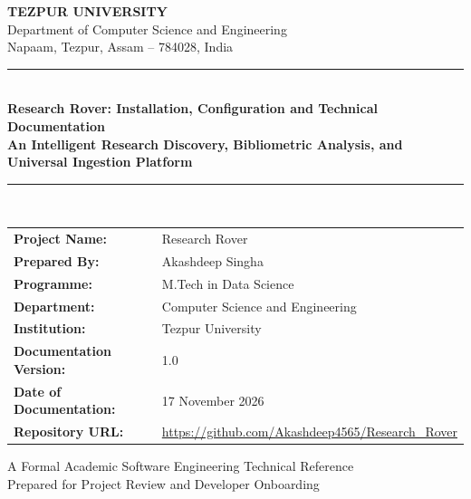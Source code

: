 \documentclass[12pt,a4paper]{article}
\begin{document}
\begin{titlepage}
    \begin{center}
        \vspace*{0.5in}
        
        {\Large \textbf{TEZPUR UNIVERSITY}}\\[0.2cm]
        {\large Department of Computer Science and Engineering}\\[0.1cm]
        {\normalsize Napaam, Tezpur, Assam -- 784028, India}\\[1.5cm]
        
        \rule{\linewidth}{1.2pt}\\[0.4cm]
        {\huge \textbf{Research Rover: Installation, Configuration and Technical Documentation}}\\[0.3cm]
        {\large \textbf{An Intelligent Research Discovery, Bibliometric Analysis, and Universal Ingestion Platform}}\\[0.2cm]
        \rule{\linewidth}{1.2pt}\\[2.0cm]
        
        \begin{minipage}{0.85\textwidth}
            \begin{tabular}{ll}
                \textbf{Project Name:} & Research Rover \\
                \textbf{Prepared By:} & Akashdeep Singha \\
                \textbf{Programme:} & M.Tech in Data Science \\
                \textbf{Department:} & Computer Science and Engineering \\
                \textbf{Institution:} & Tezpur University \\
                \textbf{Documentation Version:} & 1.0 \\
                \textbf{Date of Documentation:} & 17 November 2026 \\
                \textbf{Repository URL:} & \url{https://github.com/Akashdeep4565/Research_Rover} \\
            \end{tabular}
        \end{minipage}
        
        \vfill
        
        {\normalsize A Formal Academic Software Engineering Technical Reference\\Prepared for Project Review and Developer Onboarding}
        
        \vspace*{0.5in}
    \end{center}
\end{titlepage}
\end{document}
